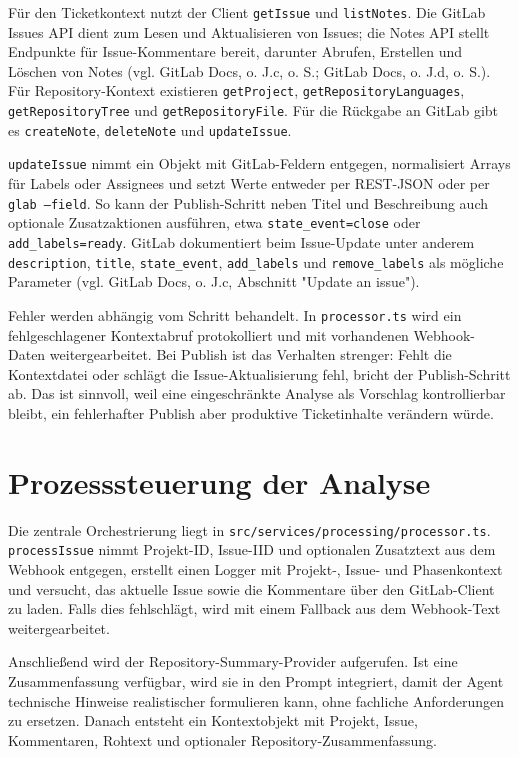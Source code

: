 \documentclass[12pt,a4paper,oneside]{scrreprt}
\begin{document}
Für den Ticketkontext nutzt der Client \texttt{getIssue} und \texttt{listNotes}. Die GitLab Issues API dient zum Lesen und Aktualisieren von Issues; die Notes API stellt Endpunkte für Issue-Kommentare bereit, darunter Abrufen, Erstellen und Löschen von Notes (vgl. GitLab Docs, o. J.c, o. S.; GitLab Docs, o. J.d, o. S.). Für Repository-Kontext existieren \texttt{getProject}, \texttt{getRepositoryLanguages}, \texttt{getRepositoryTree} und \texttt{getRepositoryFile}. Für die Rückgabe an GitLab gibt es \texttt{createNote}, \texttt{deleteNote} und \texttt{updateIssue}.

\texttt{updateIssue} nimmt ein Objekt mit GitLab-Feldern entgegen, normalisiert Arrays für Labels oder Assignees und setzt Werte entweder per REST-JSON oder per \texttt{glab --field}. So kann der Publish-Schritt neben Titel und Beschreibung auch optionale Zusatzaktionen ausführen, etwa \texttt{state\_event=close} oder \texttt{add\_labels=ready}. GitLab dokumentiert beim Issue-Update unter anderem \texttt{description}, \texttt{title}, \texttt{state\_event}, \texttt{add\_labels} und \texttt{remove\_labels} als mögliche Parameter (vgl. GitLab Docs, o. J.c, Abschnitt "Update an issue").

Fehler werden abhängig vom Schritt behandelt. In \texttt{processor.ts} wird ein fehlgeschlagener Kontextabruf protokolliert und mit vorhandenen Webhook-Daten weitergearbeitet. Bei Publish ist das Verhalten strenger: Fehlt die Kontextdatei oder schlägt die Issue-Aktualisierung fehl, bricht der Publish-Schritt ab. Das ist sinnvoll, weil eine eingeschränkte Analyse als Vorschlag kontrollierbar bleibt, ein fehlerhafter Publish aber produktive Ticketinhalte verändern würde.

\section{Prozesssteuerung der Analyse}

Die zentrale Orchestrierung liegt in \texttt{src/services/processing/processor.ts}. \texttt{processIssue} nimmt Projekt-ID, Issue-IID und optionalen Zusatztext aus dem Webhook entgegen, erstellt einen Logger mit Projekt-, Issue- und Phasenkontext und versucht, das aktuelle Issue sowie die Kommentare über den GitLab-Client zu laden. Falls dies fehlschlägt, wird mit einem Fallback aus dem Webhook-Text weitergearbeitet.

Anschließend wird der Repository-Summary-Provider aufgerufen. Ist eine Zusammenfassung verfügbar, wird sie in den Prompt integriert, damit der Agent technische Hinweise realistischer formulieren kann, ohne fachliche Anforderungen zu ersetzen. Danach entsteht ein Kontextobjekt mit Projekt, Issue, Kommentaren, Rohtext und optionaler Repository-Zusammenfassung.
\end{document}
